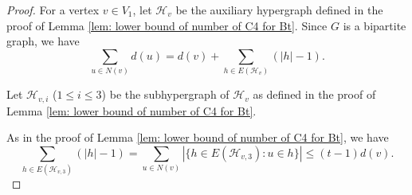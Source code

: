 \documentclass[10pt,a4paper]{amsart}
\begin{document}
        \begin{proof}
            For a vertex $v \in V_1$, let $\mathcal{H}_v$ be the auxiliary hypergraph defined in the proof of Lemma \ref{lem: lower bound of number of C4 for Bt}.
            Since $G$ is a bipartite graph, we have
            \begin{equation}\label{eq: sum of dv bip}
                \sum_{u \in N(v)} d(u) = d(v) + \sum_{h \in E(\mathcal{H}_v)} (|h| - 1).
            \end{equation}

            Let $\mathcal{H}_{v, i}$ ($1 \leq i \leq 3$) be the subhypergraph of $\mathcal{H}_v$ as defined in the proof of Lemma \ref{lem: lower bound of number of C4 for Bt}.

            As in the proof of Lemma \ref{lem: lower bound of number of C4 for Bt}, we have 
            \begin{equation}\label{eq: lem2.2 1}
                \sum_{h \in E(\mathcal{H}_{v, 3})} (|h| - 1) = \sum_{u \in N(v)} |\{h \in E(\mathcal{H}_{v, 3}): u \in h\}| \leq (t-1) d(v).
            \end{equation}


\end{proof}
\end{document}
